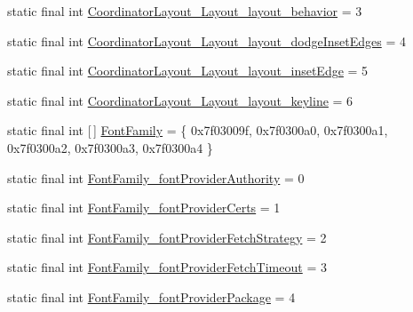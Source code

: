 \begin{DoxyCompactItemize}
\item 
static final int \mbox{\hyperlink{classandroid_1_1support_1_1graphics_1_1drawable_1_1animated_1_1_r_1_1styleable_aa330064d2098a1160e57e687ec47d18f}{Coordinator\+Layout\+\_\+\+Layout\+\_\+layout\+\_\+behavior}} = 3
\item 
static final int \mbox{\hyperlink{classandroid_1_1support_1_1graphics_1_1drawable_1_1animated_1_1_r_1_1styleable_aa035a829da25533d960b898d6c239523}{Coordinator\+Layout\+\_\+\+Layout\+\_\+layout\+\_\+dodge\+Inset\+Edges}} = 4
\item 
static final int \mbox{\hyperlink{classandroid_1_1support_1_1graphics_1_1drawable_1_1animated_1_1_r_1_1styleable_a1f2f9b095821b48c74653188699dc2bc}{Coordinator\+Layout\+\_\+\+Layout\+\_\+layout\+\_\+inset\+Edge}} = 5
\item 
static final int \mbox{\hyperlink{classandroid_1_1support_1_1graphics_1_1drawable_1_1animated_1_1_r_1_1styleable_a453be1f1052a62a236686bdfcc6daff0}{Coordinator\+Layout\+\_\+\+Layout\+\_\+layout\+\_\+keyline}} = 6
\item 
static final int \mbox{[}$\,$\mbox{]} \mbox{\hyperlink{classandroid_1_1support_1_1graphics_1_1drawable_1_1animated_1_1_r_1_1styleable_a1f2454ad7d6b6aa9d74c5b9ee6507f41}{Font\+Family}} = \{ 0x7f03009f, 0x7f0300a0, 0x7f0300a1, 0x7f0300a2, 0x7f0300a3, 0x7f0300a4 \}
\item 
static final int \mbox{\hyperlink{classandroid_1_1support_1_1graphics_1_1drawable_1_1animated_1_1_r_1_1styleable_a8f6f7c2091c3f4760f5ddaf8647de3ab}{Font\+Family\+\_\+font\+Provider\+Authority}} = 0
\item 
static final int \mbox{\hyperlink{classandroid_1_1support_1_1graphics_1_1drawable_1_1animated_1_1_r_1_1styleable_a8f48bd621a033f8533c863b77c5f1ecc}{Font\+Family\+\_\+font\+Provider\+Certs}} = 1
\item 
static final int \mbox{\hyperlink{classandroid_1_1support_1_1graphics_1_1drawable_1_1animated_1_1_r_1_1styleable_a9132a3c3cbc42ac22c69fd63ea2f0aaf}{Font\+Family\+\_\+font\+Provider\+Fetch\+Strategy}} = 2
\item 
static final int \mbox{\hyperlink{classandroid_1_1support_1_1graphics_1_1drawable_1_1animated_1_1_r_1_1styleable_a26e58b8226dabd8e5e105562c4459cf6}{Font\+Family\+\_\+font\+Provider\+Fetch\+Timeout}} = 3
\item 
static final int \mbox{\hyperlink{classandroid_1_1support_1_1graphics_1_1drawable_1_1animated_1_1_r_1_1styleable_ae01a830a725d0de14d44a88c59357f17}{Font\+Family\+\_\+font\+Provider\+Package}} = 4
\item 

\end{DoxyCompactItemize}
